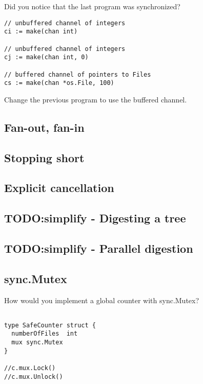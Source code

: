 \documentclass[11pt, letterpaper]{article}
\begin{document}
Did you notice that the last program was synchronized?

\begin{verbatim}
// unbuffered channel of integers
ci := make(chan int)

// unbuffered channel of integers
cj := make(chan int, 0)

// buffered channel of pointers to Files
cs := make(chan *os.File, 100)
\end{verbatim}

Change the previous program to use the buffered channel.



\subsection{Fan-out, fan-in}




\subsection{Stopping short}


\subsection{Explicit cancellation}

\subsection{TODO:simplify - Digesting a tree}


\subsection{TODO:simplify  - Parallel digestion}

\subsection{sync.Mutex}
How would you implement a global counter with sync.Mutex?

\begin{verbatim}

type SafeCounter struct {
  numberOfFiles  int
  mux sync.Mutex
}

//c.mux.Lock()
//c.mux.Unlock()
\end{verbatim}
\end{document}
